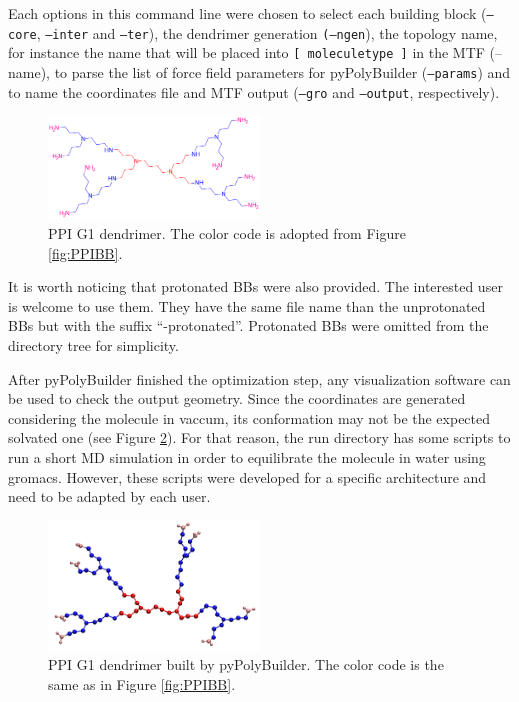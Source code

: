Each options in this command line were chosen to select each building block (\texttt{--core}, \texttt{--inter} and \texttt{--ter}),  the dendrimer generation \texttt{(--ngen}), the topology name, for instance the name that will be placed into \texttt{[ moleculetype ]} in the MTF 
(--name), to parse the list of force field parameters for pyPolyBuilder (\texttt{--params}) and to name the coordinates file and MTF output (\texttt{--gro} and \texttt{--output}, respectively).

\begin{figure}
    \centering
    \includegraphics[width=0.5\textwidth]{PPI/PPIG1.png}
    \caption{PPI G1 dendrimer.
             The color code is adopted from Figure \ref{fig:PPIBB}.}
    \label{fig:PPIG1}
\end{figure}

It is worth noticing that protonated BBs were also provided.
The interested user is welcome to use them.
They have the same file name than the unprotonated BBs but with the suffix ``-protonated''.
Protonated BBs were omitted from the directory tree for simplicity.

After pyPolyBuilder finished the optimization step, any visualization software can be used to check the output geometry. 
Since the coordinates are generated considering the molecule in vaccum, its conformation may not be the expected solvated one (see Figure \ref{fig:PPIG1PPB}).
For that reason, the run directory has some scripts to run a short MD simulation in order to equilibrate the molecule in water using gromacs.
However, these scripts were developed for a specific architecture and need to be adapted by each user.

\begin{figure}
    \centering
    \includegraphics[width=0.5\textwidth]{PPI/PPI.pdf}
    \caption{PPI G1 dendrimer built by pyPolyBuilder.
             The color code is the same as in Figure \ref{fig:PPIBB}.}
    \label{fig:PPIG1PPB}
\end{figure}

